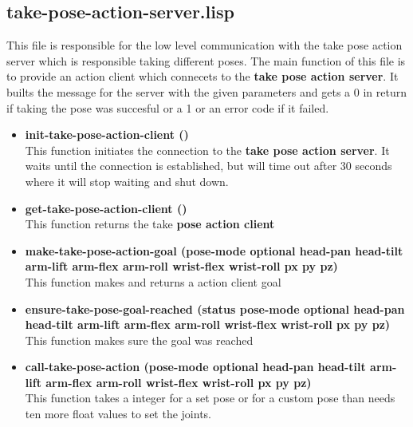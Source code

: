 \documentclass[main.tex]{subfiles}
\begin{document}
		\subsection{take-pose-action-server.lisp}
		This file is responsible for the low level communication with the
		take pose action server which is responsible taking different poses. The main function of this file is to provide an action client which connecets to the \textbf{take pose action server}. It builts the message for the server with the given parameters and gets a 0 in return if taking the pose was succesful or a 1  or an error code if it failed.
		\begin{itemize}
			\item \textbf{init-take-pose-action-client ()} \\
			This function initiates the connection to the \textbf{take pose action server}. It waits until the connection is established, but will time out after 30 seconds where it will stop waiting and shut down. 
			\item \textbf{get-take-pose-action-client ()} \\
			This function returns the take \textbf{pose action client}
			\item \textbf{make-take-pose-action-goal (pose-mode optional head-pan head-tilt arm-lift arm-flex arm-roll wrist-flex wrist-roll px py pz)} \\
			This function makes and returns a action client goal
			\item \textbf{ensure-take-pose-goal-reached (status pose-mode optional head-pan head-tilt arm-lift arm-flex arm-roll wrist-flex wrist-roll px py pz)} \\
            This function makes sure the goal was reached
			\item \textbf{call-take-pose-action (pose-mode optional head-pan head-tilt arm-lift arm-flex arm-roll wrist-flex wrist-roll px py pz)} \\
			This function takes a integer for a set pose or for a custom pose than needs ten more float values to set the joints.
		\end{itemize}
\end{document}
